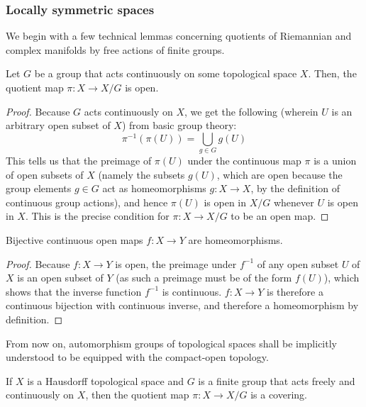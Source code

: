         \subsubsection{Locally symmetric spaces}
            We begin with a few technical lemmas concerning quotients of Riemannian and complex manifolds by free actions of finite groups.
            \begin{lemma} \label{lemma: quotients_by_group_actions_are_open}
    	        Let $G$ be a group that acts continuously on some topological space $X$. Then, the quotient map $\pi: X \to X/G$ is open.
    	    \end{lemma}
    	        \begin{proof}
    	            Because $G$ acts continuously on $X$, we get the following (wherein $U$ is an arbitrary open subset of $X$) from basic group theory:
    	                $$\pi^{-1}(\pi(U)) = \bigcup_{g \in G} g(U)$$
                    This tells us that the preimage of $\pi(U)$ under the continuous map $\pi$ is a union of open subsets of $X$ (namely the subsets $g(U)$, which are open because the group elements $g \in G$ act as homeomorphisms $g: X \to X$, by the definition of continuous group actions), and hence $\pi(U)$ is open in $X/G$ whenever $U$ is open in $X$. This is the precise condition for $\pi: X \to X/G$ to be an open map.
    	        \end{proof}
            \begin{lemma} \label{lemma: bijective_continuous_open_maps_are_homeomorphisms}
                Bijective continuous open maps $f: X \to Y$ are homeomorphisms.
            \end{lemma}
                \begin{proof}
                    Because $f: X \to Y$ is open, the preimage under $f^{-1}$ of any open subset $U$ of $X$ is an open subset of $Y$ (as such a preimage must be of the form $f(U)$), which shows that the inverse function $f^{-1}$ is continuous. $f: X \to Y$ is therefore a continuous bijection with continuous inverse, and therefore a homeomorphism by definition. 
                \end{proof}
            \begin{convention}
                From now on, automorphism groups of topological spaces shall be implicitly understood to be equipped with the compact-open topology.
            \end{convention}
            \begin{proposition} \label{prop: coverings_from_free_actions_of_finite_groups}
                If $X$ is a Hausdorff topological space and $G$ is a finite group that acts freely and continuously on $X$, then the quotient map $\pi: X \to X/G$ is a covering.
            \end{proposition}
